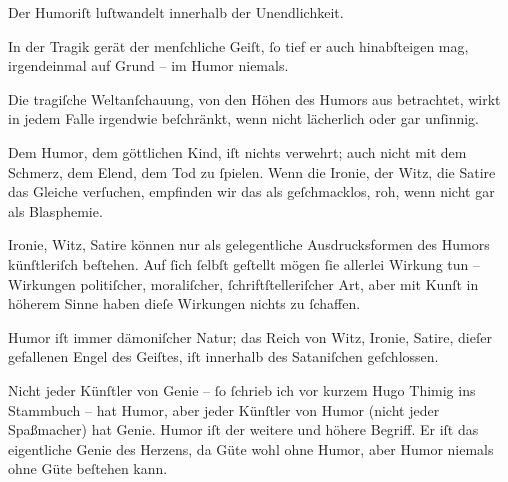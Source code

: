 \pstart
           Der Humoriſt luſtwandelt innerhalb der Unendlichkeit.\pend
           
\pstart
           In der Tragik gerät der menſchliche Geiſt,{ }ſo tief er auch hinabſteigen mag,
                  irgendeinmal auf Grund – im Humor niemals.\pend
           
\pstart
           Die tragiſche Weltanſchauung, von den Höhen des Humors aus betrachtet, wirkt in
                  jedem Falle irgendwie beſchränkt, wenn nicht lächerlich oder gar unſinnig.\pend
           
\pstart
           Dem Humor, dem göttlichen Kind, iſt nichts verwehrt; auch nicht mit dem Schmerz,
                  dem Elend, dem Tod zu{ }ſpielen. Wenn die Ironie, der Witz, die Satire das Gleiche
                  verſuchen, empfinden wir das als geſchmacklos, roh, wenn nicht gar als
                  Blasphemie.\pend
           
\pstart
           Ironie, Witz, Satire können nur als gelegentliche Ausdrucksformen des Humors
                  künſtleriſch beſtehen. Auf{ }ſich{ }ſelbſt geſtellt mögen{ }ſie allerlei Wirkung tun –
                  Wirkungen politiſcher, moraliſcher,{ }ſchriftſtelleriſcher Art, aber mit Kunſt in
                  höherem Sinne haben dieſe Wirkungen nichts zu{ }ſchaffen.\pend
           
\pstart
           Humor iſt immer dämoniſcher Natur; das Reich von Witz, Ironie, Satire, dieſer
                  gefallenen Engel des Geiſtes, iſt innerhalb des Sataniſchen geſchlossen.\pend
           
\pstart
           Nicht jeder Künſtler von Genie –{ }ſo{ }ſchrieb ich vor kurzem Hugo Thimig ins Stammbuch – hat Humor, aber jeder Künſtler
                  von Humor (nicht jeder Spaßmacher) hat Genie. Humor iſt der weitere und höhere
                  Begriff. Er iſt das eigentliche Genie des Herzens, da Güte wohl ohne Humor, aber
                  Humor niemals ohne Güte beſtehen kann.\pend
           \endnumbering{}  \newcommand{\dateiname}{L02442}\newcommand{\titel}{Arthur Schnitzler an Thomas Mann, 7. 6. 1925}\newcommand{\editorInnen}{Martin Anton Müller und Gerd-Hermann Susen}
